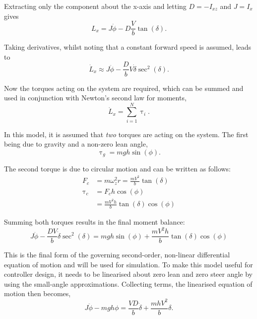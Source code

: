 Extracting only the component about the x-axis and letting $D=-I_{xz}$ and $J=I_x$ gives
\begin{equation*}
L_x = J \dot{\phi} - D \frac{V}{b} \tan{(\delta)}.
\end{equation*}

Taking derivatives, whilst noting that a constant forward speed is assumed, leads to
\begin{equation*}
\dot{L}_x \approx J \ddot{\phi} - \frac{D}{b} V \dot{\delta} \sec^2{(\delta)}.
\end{equation*}

Now the torques acting on the system are required, which can be summed and used in conjunction with Newton's second law for moments,
\begin{equation*}
\dot{L}_x = \sum_{i=1}^N{\uptau_i}.
\end{equation*}

In this model, it is assumed that \textit{two} torques are acting on the system. The first being due to gravity and a non-zero lean angle,
\begin{equation*}
\uptau_{g} = m g h \sin{(\phi)}.
\end{equation*}

The second torque is due to circular motion and can be written as follows:
\begin{align*}
F_c &= m \omega^2_z r = \frac{m V^2}{b} \tan{(\delta)} \\
\uptau_c &= F_c h \cos{(\phi)} \\
&= \frac{m V^2 h}{b} \tan{(\delta)} \cos{(\phi)}
\end{align*}

Summing both torques results in the final moment balance:
\begin{equation}
J \ddot{\phi} - \frac{D V}{b} \dot{\delta} \sec^2{(\delta)} = m g h \sin{(\phi)} + \frac{m V^2 h}{b} \tan{(\delta)} \cos{(\phi)}
\label{eq:2ndOrderNL}
\end{equation}

This is the final form of the governing second-order, non-linear differential equation of motion and will be used for simulation. To make this model useful for controller design, it needs to be linearised about zero lean and zero steer angle by using the small-angle approximations. Collecting terms, the linearised equation of motion then becomes,
\begin{equation}
J \ddot{\phi} - m g h \phi = \frac{V D}{b} \dot{\delta} + \frac{m h V^2}{b} \delta.
\end{equation}

